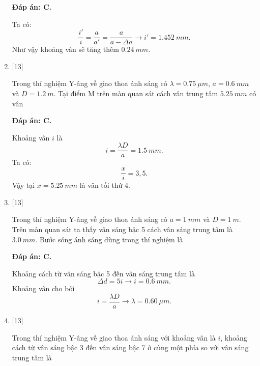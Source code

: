 \begin{enumerate}[label=\bfseries Câu \arabic*:]
	\loigiai
	{		\textbf{Đáp án: C.}
		
		Ta có:
		$$
		\dfrac{i'}{i} = \dfrac{a}{a'} = \dfrac{a}{a- \Delta a} \rightarrow i' = \SI{1,452}{mm}.
		$$
		Như vậy khoảng vân sẽ tăng thêm $\SI{0,24}{mm}$.
	}
	
	\item {} [13]
	\cauhoi
	{Trong thí nghiệm Y-âng về giao thoa ánh sáng có $\lambda = \SI{0,75}{\mu m}$, $a = \SI{0,6}{mm}$ và $D = \SI{1,2}{m}$. Tại điểm M trên màn quan sát cách vân trung tâm $\SI{5,25}{mm}$ có vân
	}
	
	\loigiai
	{		\textbf{Đáp án: C.}
		
		Khoảng vân $i$ là
		$$
		i = \dfrac{\lambda D}{a} = \SI{1,5}{mm}. 
		$$
		Ta có:
		$$
		\dfrac{x}{i} = 3,5.
		$$
		Vậy tại $x = \SI{5,25}{mm}$ là vân tối thứ 4.
	}
	
	\item {} [13]
	\cauhoi
	{Trong thí nghiệm Y-âng về giao thoa ánh sáng có $a = \SI{1}{mm}$ và $D = \SI{1}{m}$. Trên màn quan sát ta thấy vân sáng bậc 5 cách vân sáng trung tâm là $\SI{3,0}{mm}$. Bước sóng ánh sáng dùng trong thí nghiệm là
	}
	
	\loigiai
	{		\textbf{Đáp án: C.}
		
		Khoảng cách từ vân sáng bậc 5 đến vân sáng trung tâm là
		$$
		\Delta d = 5i \rightarrow  i = \SI{0,6}{mm}.
		$$
		Khoảng vân cho bởi
		$$
		i = \dfrac{\lambda D}{a} \rightarrow \lambda = \SI{0,60}{\mu m}.
		$$
	}
	
	\item {} [13]
	\cauhoi
	{Trong thí nghiệm Y-âng về giao thoa ánh sáng với khoảng vân là $i$, khoảng cách từ vân sáng bậc 3 đến vân sáng bậc 7 ở cùng một phía so với vân sáng trung tâm là 
	}
	

\end{enumerate}
